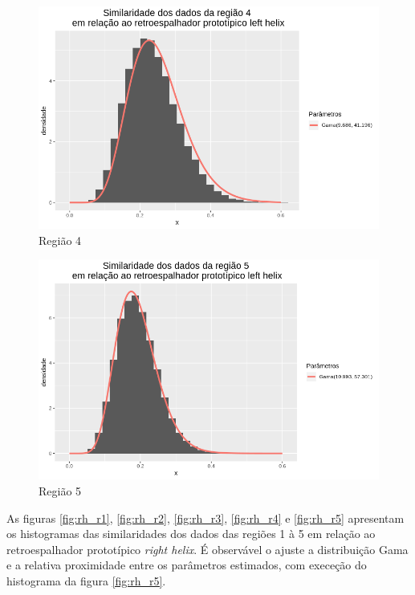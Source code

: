 \documentclass[12pt]{article}
\begin{document}
\begin{figure}[!h]
    \centering
    \vspace{0.10\linewidth}
    \includegraphics[width = \linewidth]{../../Images/Report_18_12_20/lh_region4.png}
    \caption{Região 4}
    \label{fig:lh_r4}
\end{figure}

\begin{figure}[!h]
    \centering
    \vspace{0.1\linewidth}
    \includegraphics[width = \linewidth]{../../Images/Report_18_12_20/lh_region5.png}
    \caption{Região 5}
    \label{fig:lh_r5}
\end{figure}

As figuras \ref{fig:rh_r1}, \ref{fig:rh_r2}, \ref{fig:rh_r3}, \ref{fig:rh_r4} e \ref{fig:rh_r5} apresentam os histogramas das similaridades dos dados das regiões 1 à 5 em relação ao retroespalhador prototípico \textit{right helix}. É observável o ajuste a distribuição Gama e a relativa proximidade entre os parâmetros estimados, com execeção do histograma da figura \ref{fig:rh_r5}.
\end{document}
